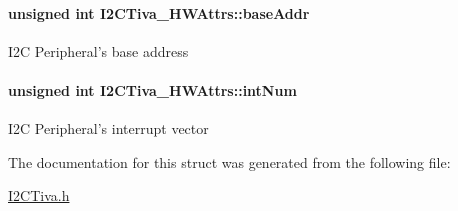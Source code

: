 \paragraph[{base\-Addr}]{\setlength{\rightskip}{0pt plus 5cm}unsigned int I2\-C\-Tiva\-\_\-\-H\-W\-Attrs\-::base\-Addr}\label{struct_i2_c_tiva___h_w_attrs_a12ab64360a0c09bbc1324d0935fcb63a}
I2\-C Peripheral's base address 
\paragraph[{int\-Num}]{\setlength{\rightskip}{0pt plus 5cm}unsigned int I2\-C\-Tiva\-\_\-\-H\-W\-Attrs\-::int\-Num}\label{struct_i2_c_tiva___h_w_attrs_adad44a5cf7a642e83e07b364e7623cb3}
I2\-C Peripheral's interrupt vector 

The documentation for this struct was generated from the following file\-:\begin{DoxyCompactItemize}
\item 
\hyperlink{_i2_c_tiva_8h}{I2\-C\-Tiva.\-h}\end{DoxyCompactItemize}
